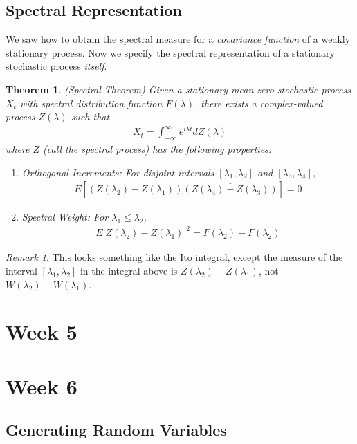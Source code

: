 \documentclass[12pt]{article}
\theoremstyle{plain}
\newtheorem{thm}{Theorem}[section]
\theoremstyle{definition}
\theoremstyle{remark}
\newtheorem*{rmk}{Remark}
\begin{document}
\subsection{Spectral Representation}

We saw how to obtain the spectral measure for a \emph{covariance
function} of a weakly stationary process. Now we specify the spectral
representation of a stationary stochastic process \emph{itself}.

\begin{thm}\emph{(Spectral Theorem)}
Given a stationary mean-zero stochastic process $X_t$ with spectral
distribution function $F(\lambda)$, there exists a complex-valued
process $Z(\lambda)$ such that
\begin{align*}
  X_t = \int^\infty_{-\infty} e^{i\lambda t} dZ(\lambda)
\end{align*}
where $Z$ (call the \emph{spectral process}) has the following
properties:
\begin{enumerate}
  \item Orthogonal Increments: For disjoint intervals
    $[\lambda_1,\lambda_2]$ and $[\lambda_3,\lambda_4]$,
    \begin{align*}
      E\left[
        (Z(\lambda_2)-Z(\lambda_1))
        \overline{(Z(\lambda_4)-Z(\lambda_3))}
      \right] = 0
    \end{align*}
  \item Spectral Weight: For $\lambda_1\leq \lambda_2$,
    \begin{align*}
      E\left\lvert Z(\lambda_2)-Z(\lambda_1)\right\rvert^2
      = F(\lambda_2)-F(\lambda_2)
    \end{align*}
\end{enumerate}
\end{thm}
\begin{rmk}
This looks something like the Ito integral, except the measure of the
interval $[\lambda_1,\lambda_2]$ in the integral above is
$Z(\lambda_2)-Z(\lambda_1)$, not $W(\lambda_2)-W(\lambda_1)$.
\end{rmk}

\section{Week 5}

\section{Week 6}

\subsection{Generating Random Variables}
\end{document}
